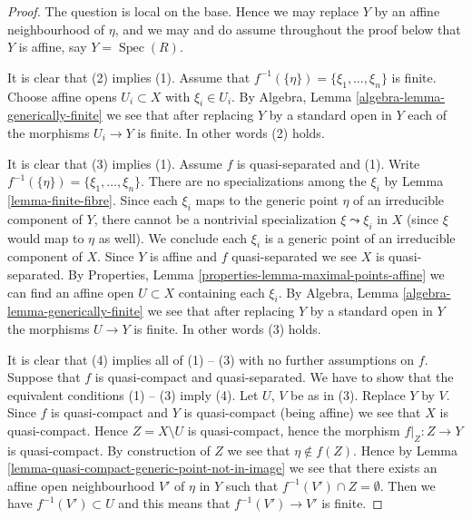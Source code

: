 \documentclass[10pt,a4paper]{amsart}
\theoremstyle{plain}
\theoremstyle{definition}
\theoremstyle{remark}
\numberwithin{equation}{subsection}
\def\Spec{\mathop{\mathrm{Spec}}}
\begin{document}
\begin{proof}
The question is local on the base. Hence we may replace $Y$ by an
affine neighbourhood of $\eta$, and we may and do assume throughout
the proof below that $Y$ is affine, say $Y = \Spec(R)$.

\medskip\noindent
It is clear that (2) implies (1).
Assume that $f^{-1}(\{\eta\}) = \{\xi_1, \ldots, \xi_n\}$ is finite.
Choose affine opens $U_i \subset X$ with $\xi_i \in U_i$.
By Algebra, Lemma \ref{algebra-lemma-generically-finite} we see
that after replacing $Y$ by a standard open in
$Y$ each of the morphisms $U_i \to Y$ is finite.
In other words (2) holds.

\medskip\noindent
It is clear that (3) implies (1). Assume $f$ is quasi-separated and (1).
Write $f^{-1}(\{\eta\}) = \{\xi_1, \ldots, \xi_n\}$. There are no
specializations among the $\xi_i$ by Lemma \ref{lemma-finite-fibre}.
Since each $\xi_i$ maps to the generic
point $\eta$ of an irreducible component of $Y$, there cannot be a
nontrivial specialization $\xi \leadsto \xi_i$ in $X$
(since $\xi$ would map to $\eta$ as well).
We conclude each $\xi_i$ is a generic point of an
irreducible component of $X$.
Since $Y$ is affine and $f$ quasi-separated we see $X$ is quasi-separated.
By Properties, Lemma \ref{properties-lemma-maximal-points-affine}
we can find an affine open $U \subset X$ containing each $\xi_i$.
By Algebra, Lemma \ref{algebra-lemma-generically-finite} we see
that after replacing $Y$ by a standard open in
$Y$ the morphisms $U \to Y$ is finite.
In other words (3) holds.

\medskip\noindent
It is clear that (4) implies all of (1) -- (3) with no further assumptions
on $f$. Suppose that $f$ is quasi-compact and quasi-separated. We have to
show that the equivalent conditions (1) -- (3) imply (4).
Let $U$, $V$ be as in (3). Replace $Y$ by $V$. Since $f$ is quasi-compact
and $Y$ is quasi-compact (being affine) we see that $X$ is quasi-compact.
Hence $Z = X \setminus U$ is quasi-compact, hence the morphism
$f|_Z : Z \to Y$ is quasi-compact. By construction of $Z$ we see that
$\eta \not \in f(Z)$. Hence by
Lemma \ref{lemma-quasi-compact-generic-point-not-in-image}
we see that there exists an affine open
neighbourhood $V'$ of $\eta$ in $Y$ such that $f^{-1}(V') \cap Z = \emptyset$.
Then we have $f^{-1}(V') \subset U$ and this means
that $f^{-1}(V') \to V'$ is finite.
\end{proof}
\end{document}

